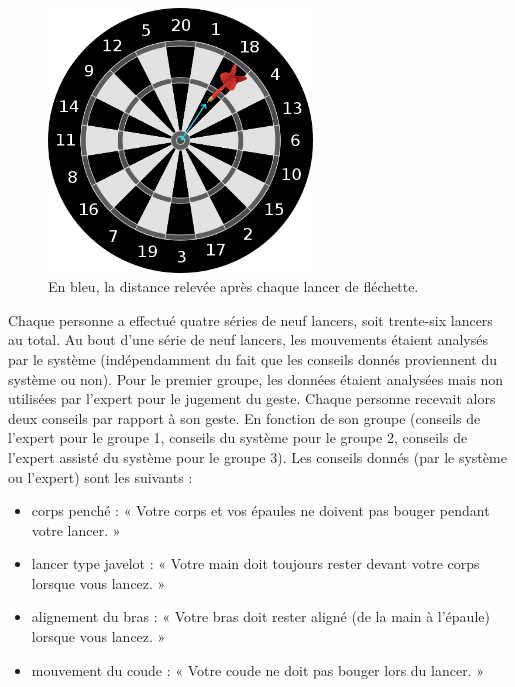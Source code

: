 \begin{figure}
    \centering
    \includegraphics[width=7cm]{pictures/target_with_darts_distance.jpg}
    \caption[Distance relevée entre les fléchettes et le centre de la cible]{En bleu, la distance relevée après chaque lancer de fléchette.}
    \label{fig:target_with_darts_distance}
\end{figure}

Chaque personne a effectué quatre séries de neuf lancers, soit trente-six lancers au total. Au bout d'une série de neuf lancers, les mouvements étaient analysés par le système (indépendamment du fait que les conseils donnés proviennent du système ou non). Pour le premier groupe, les données étaient analysées mais non utilisées par l'expert pour le jugement du geste. Chaque personne recevait alors deux conseils par rapport à son geste. En fonction de son groupe (conseils de l'expert pour le groupe 1, conseils du système pour le groupe 2, conseils de l'expert assisté du système pour le groupe 3). Les conseils donnés (par le système ou l'expert) sont les suivants :
\begin{itemize}
	\item corps penché : « Votre corps et vos épaules ne doivent pas bouger pendant votre lancer. »
	\item lancer type javelot : « Votre main doit toujours rester devant votre corps lorsque vous lancez. »
	\item alignement du bras : « Votre bras doit rester aligné (de la main à l'épaule) lorsque vous lancez. »
	\item mouvement du coude : « Votre coude ne doit pas bouger lors du lancer. »
\end{itemize}

